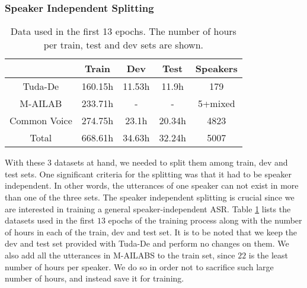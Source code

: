 \subsubsection{Speaker Independent Splitting}
\label{meth:s4_sub3_subsub1}

\begin{table}[!ht]
	\centering
	\begin{tabular}{ || c | c | c | c | c || } 
		\hline
		&   Train   &   Dev &   Test    &   Speakers \\ 
		\hline
		Tuda-De &   160.15h &   11.53h  &   11.9h   &   179 \\
		\hline
		M-AILAB &   233.71h &   -   &   -   &   5+mixed \\ 
		\hline
		Common Voice    &   274.75h &   23.1h   &   20.34h  &   4823 \\
		\hline
		Total   &   668.61h &   34.63h  &   32.24h  &   5007 \\
		\hline
	\end{tabular}
	\caption{Data used in the first 13 epochs. The number of hours per train, test and dev sets are shown.}
	\label{meth:table1}
\end{table}

With these $3$ datasets at hand, we needed to split them among train, dev and test sets. One significant criteria for the splitting was that it had to be speaker independent. In other words, the utterances of one speaker can not exist in more than one of the three sets. The speaker independent splitting is crucial since we are interested in training a general speaker-independent \ac{ASR}. Table \ref{meth:table1} lists the datasets used in the first $13$ epochs of the training process along with the number of hours in each of the train, dev and test set. It is to be noted that we keep the dev and test set provided with Tuda-De and perform no changes on them. We also add all the utterances in M-AILABS to the train set, since $22$ is the least number of hours per speaker. We do so in order not to sacrifice such large number of hours, and instead save it for training.

